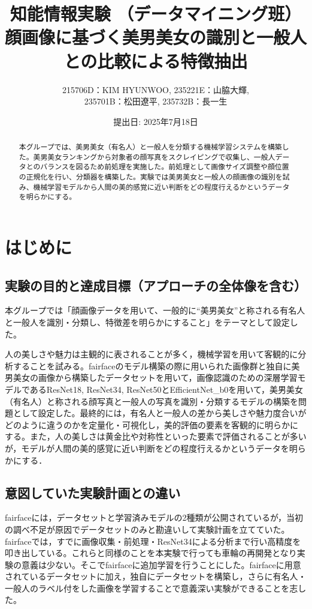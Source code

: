 \documentclass[a4paper,11pt,titlepage]{jsarticle}
\begin{document}
\title{知能情報実験 （データマイニング班）\\顔画像に基づく美男美女の識別と一般人との比較による特徴抽出}
\author{215706D：KIM HYUNWOO, 235221E：山脇大輝,\\ 235701B：松田遼平, 235732B：長一生}
\date{提出日: 2025年7月18日}
\maketitle

\tableofcontents
\clearpage

\begin{abstract}
本グループでは、美男美女（有名人）と一般人を分類する機械学習システムを構築した。美男美女ランキングから対象者の顔写真をスクレイピングで収集し、一般人データとのバランスを図るため前処理を実施した。前処理として画像サイズ調整や顔位置の正規化を行い、分類器を構築した。実験では美男美女と一般人の顔画像の識別を試み、機械学習モデルから人間の美的感覚に近い判断をどの程度行えるかというデータを明らかにする。
\end{abstract} 


\section{はじめに}
\subsection{実験の目的と達成目標（アプローチの全体像を含む）}
本グループでは「顔画像データを用いて、一般的に“美男美女”と称される有名人と一般人を識別・分類し、特徴差を明らかにすること」をテーマとして設定した。

人の美しさや魅力は主観的に表されることが多く，機械学習を用いて客観的に分析することを試みる。fairfaceのモデル構築の際に用いられた画像群と独自に美男美女の画像から構築したデータセットを用いて，画像認識のための深層学習モデルであるResNet18, ResNet34, ResNet50とEfficientNet\_b0を用いて，美男美女（有名人）と称される顔写真と一般人の写真を識別・分類するモデルの構築を問題として設定した。最終的には，有名人と一般人の差から美しさや魅力度合いがどのように違うのかを定量化・可視化し，美的評価の要素を客観的に明らかにする。また，人の美しさは黄金比や対称性といった要素で評価されることが多いが，モデルが人間の美的感覚に近い判断をどの程度行えるかというデータを明らかにする．

\subsection{意図していた実験計画との違い}
fairfaceには，データセットと学習済みモデルの2種類が公開されているが，当初の調べ不足が原因でデータセットのみと勘違いして実験計画を立てていた。fairfaceでは，すでに画像収集・前処理・ResNet34による分析まで行い高精度を叩き出している。これらと同様のことを本実験で行っても車輪の再開発となり実験の意義は少ない。そこでfairfaceに追加学習を行うことにした。fairfaceに用意されているデータセットに加え，独自にデータセットを構築し，さらに有名人・一般人のラベル付をした画像を学習することで意義深い実験ができることを志した。
\end{document}
